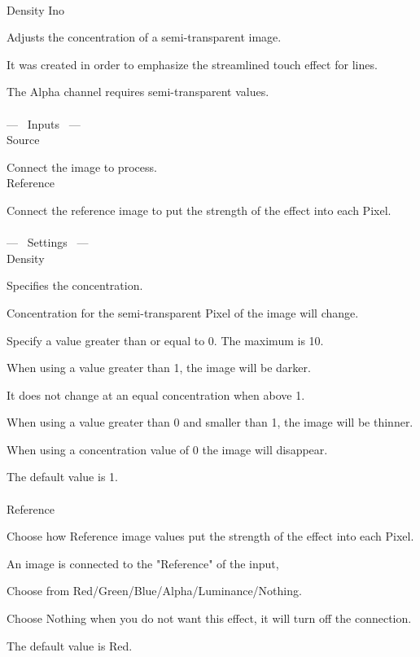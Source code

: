 \documentclass[a4paper,12pt]{article}
\begin{document}
\thispagestyle{empty}

\Large
\noindent \\
Density Ino\medskip
\par
\normalsize
Adjusts the concentration of a semi-transparent image.\par
It was created in order to emphasize the streamlined touch effect for lines.\par
The Alpha channel requires semi-transparent values.\\
\\
--- \ Inputs \ ---\\
Source\par
Connect the image to process.\\
Reference\par
Connect the reference image to put the strength of the effect into each Pixel.\\
\\
--- \ Settings \ ---\\
Density\par
Specifies the concentration.\par
Concentration for the semi-transparent Pixel of the image will change.\par
Specify a value greater than or equal to 0. The maximum is 10.\par
When using a value greater than 1, the image will be darker.\par
It does not change at an equal concentration when above 1.\par
When using a value greater than 0 and smaller than 1, the image will be thinner.\par
When using a concentration value of 0 the image will disappear.\par
The default value is 1.\\
\\
Reference\par
Choose how Reference image values put the strength of the effect into each Pixel.\par
An image is connected to the "Reference" of the input,\par
Choose from Red/Green/Blue/Alpha/Luminance/Nothing.\par
Choose Nothing when you do not want this effect, it will turn off the connection.\par
The default value is Red.
\end{document}
